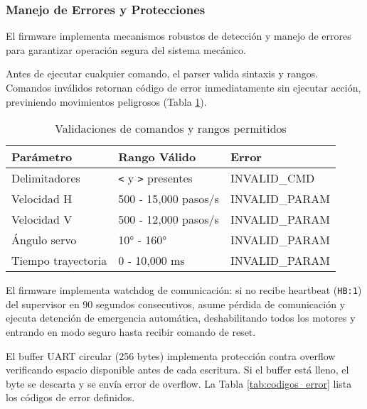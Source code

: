 \subsubsection{Manejo de Errores y Protecciones}

El firmware implementa mecanismos robustos de detección y manejo de errores para garantizar operación segura del sistema mecánico.

Antes de ejecutar cualquier comando, el parser valida sintaxis y rangos. Comandos inválidos retornan código de error inmediatamente sin ejecutar acción, previniendo movimientos peligrosos (Tabla \ref{tab:validacion_comandos}).

\begin{table}[H]
\centering
\small
\begin{tabular}{|l|l|l|}
\hline
\textbf{Parámetro} & \textbf{Rango Válido} & \textbf{Error} \\
\hline
Delimitadores & \texttt{<} y \texttt{>} presentes & INVALID\_CMD \\
\hline
Velocidad H & 500 - 15,000 pasos/s & INVALID\_PARAM \\
\hline
Velocidad V & 500 - 12,000 pasos/s & INVALID\_PARAM \\
\hline
Ángulo servo & 10° - 160° & INVALID\_PARAM \\
\hline
Tiempo trayectoria & 0 - 10,000 ms & INVALID\_PARAM \\
\hline
\end{tabular}
\caption{Validaciones de comandos y rangos permitidos}
\label{tab:validacion_comandos}
\end{table}

El firmware implementa watchdog de comunicación: si no recibe heartbeat (\texttt{HB:1}) del supervisor en 90 segundos consecutivos, asume pérdida de comunicación y ejecuta detención de emergencia automática, deshabilitando todos los motores y entrando en modo seguro hasta recibir comando de reset.

El buffer UART circular (256 bytes) implementa protección contra overflow verificando espacio disponible antes de cada escritura. Si el buffer está lleno, el byte se descarta y se envía error de overflow. La Tabla \ref{tab:codigos_error} lista los códigos de error definidos.


